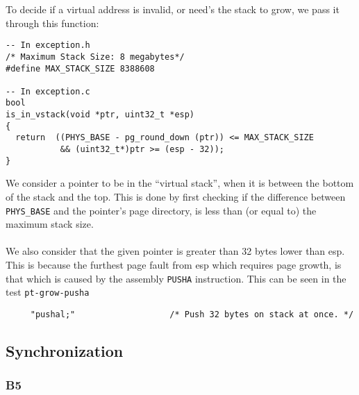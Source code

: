\documentclass[a4wide, 11pt]{article}
\newcommand{\tx}{\texttt}
\begin{document}
To decide if a virtual address is invalid, or need's the stack to grow, we pass it through this function:
\begin{verbatim}
-- In exception.h
/* Maximum Stack Size: 8 megabytes*/
#define MAX_STACK_SIZE 8388608

-- In exception.c
bool
is_in_vstack(void *ptr, uint32_t *esp)
{
  return  ((PHYS_BASE - pg_round_down (ptr)) <= MAX_STACK_SIZE
           && (uint32_t*)ptr >= (esp - 32));
}
\end{verbatim}

We consider a pointer to be in the ``virtual stack'', when it is between the bottom of the stack and the top. This is done by first checking if the difference between \tx{PHYS\_BASE} and the pointer's page directory, is less than (or equal to) the maximum stack size.\\
\\
We also consider that the given pointer is greater than 32 bytes lower than esp. This is because the furthest page fault from esp which requires page growth, is that which is caused by the assembly \tx{PUSHA} instruction. This can be seen in the test \tx{pt-grow-pusha}

\begin{verbatim}
     "pushal;"                   /* Push 32 bytes on stack at once. */
\end{verbatim}

\subsection{Synchronization}
\subsubsection{B5}
\end{document}
